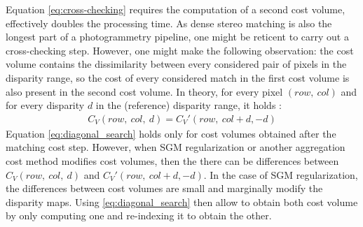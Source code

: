 \begin{remark}
     Equation \eqref{eq:cross-checking} requires the computation of a second cost volume, effectively doubles the processing time. As dense stereo matching is also the longest part of a photogrammetry pipeline, one might be reticent to carry out a cross-checking step. However, one might make the following observation: the cost volume contains the dissimilarity between every considered pair of pixels in the disparity range, so the cost of every considered match in the first cost volume is also present in the second cost volume. In theory, for every pixel $(row, ~col)$ and for every disparity $d$ in the (reference) disparity range, it holds \cite{bebis_mutual_2008}:
     \begin{align}\label{eq:diagonal_search}
         C_V(row,~col,~d) = C_V'(row,~col+d, -d)
     \end{align}
     Equation \eqref{eq:diagonal_search} holds only for cost volumes obtained after the matching cost step. However, when SGM regularization or another aggregation cost method modifies cost volumes, then the there can be differences between $C_V(row,~col,~d)$ and $C_V'(row,~col+d, -d)$. In the case of SGM regularization, the differences between cost volumes are small and marginally modify the disparity maps. Using \eqref{eq:diagonal_search} then allow to obtain both cost volume by only computing one and re-indexing it to obtain the other. 
\end{remark}
